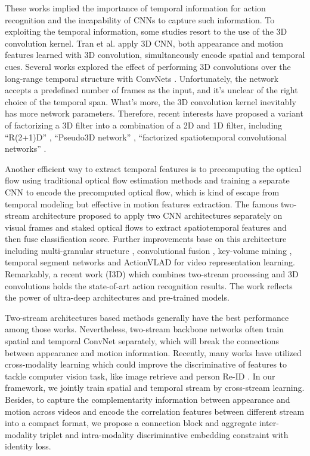 \documentclass[conference,compsoc]{IEEEtran}
\begin{document}
These works implied the importance of temporal information for action recognition and the incapability of CNNs to capture such information. To exploiting the temporal information, some studies resort to the use of the 3D convolution kernel. Tran et al. \cite{tran2015learning} \cite{tran2017convnet} apply 3D CNN, both appearance and motion features learned with 3D convolution, simultaneously encode spatial and temporal cues. Several works explored the effect of performing 3D convolutions over the long-range temporal structure with ConvNets \cite{wang2018two} \cite{yao2015describing}. Unfortunately, the network accepts a predefined number of frames as the input, and it's unclear of the right choice of the temporal span. What's more, the 3D convolution kernel inevitably has more network parameters. Therefore, recent interests have proposed a variant of factorizing a 3D filter into a combination of a 2D and 1D filter, including ``R(2+1)D'' \cite{tran2018closer}, ``Pseudo3D network'' \cite{qiu2017learning}, ``factorized spatiotemporal convolutional networks'' \cite{sun2015human}.

Another efficient way to extract temporal features is to precomputing the optical flow \cite{sun2018optical} using traditional optical flow estimation methods and training a separate CNN to encode the precomputed optical flow, which is kind of escape from temporal modeling but effective in motion features extraction. The famous two-stream architecture \cite{simonyan2014two} proposed to apply two CNN architectures separately on visual frames and staked optical flows to extract spatiotemporal features and then fuse classification score. Further improvements base on this architecture including multi-granular structure \cite{song2019temporal} \cite{zhu2018end}, convolutional fusion \cite{feichtenhofer2016convolutional} \cite{wang2018two}, key-volume mining \cite{zhu2016key}, temporal segment networks \cite{wang2016temporal} and ActionVLAD \cite{Girdhar2017ActionVLAD} for video representation learning. Remarkably, a recent work (I3D) \cite{carreira2017quo} which combines two-stream processing and 3D convolutions holds the state-of-art action recognition results. The work reflects the power of ultra-deep architectures and pre-trained models.

Two-stream architectures based methods generally have the best performance among those works. Nevertheless, two-stream backbone networks often train spatial and temporal ConvNet separately, which will break the connections between appearance and motion information. Recently, many works have utilized cross-modality learning which could improve the discriminative of features to tackle computer vision task, like image retrieve \cite{carvalho2018cross, shen2017deep, shen2015supervised} and person Re-ID \cite{xu2017learning}. In our framework, we jointly train spatial and temporal stream by cross-stream learning. Besides, to capture the complementarity information between appearance and motion across videos and encode the correlation features between different stream into a compact format, we propose a connection block and aggregate inter-modality triplet and intra-modality discriminative embedding constraint with identity loss.
\end{document}
